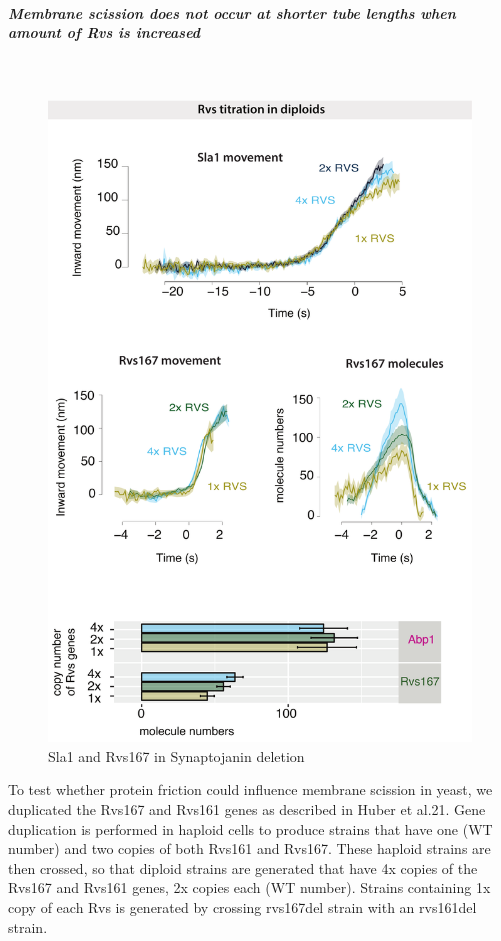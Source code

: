 	\subparagraph{Membrane scission does not occur at shorter tube lengths when amount of Rvs is increased}
		\mbox{}\\
		\begin{figure}
		\centering
		\includegraphics[width=17cm,height=17cm,keepaspectratio]{figures/results_final/protein_friction2}
		\caption{Sla1 and Rvs167 in Synaptojanin deletion \label{fig5}}
		\end{figure}
	To test whether protein friction could influence membrane scission in yeast, we duplicated the Rvs167 and Rvs161 genes as described in Huber et al.21. Gene duplication is performed in haploid cells to produce strains that have one (WT number) and two copies of both Rvs161 and Rvs167. These haploid strains are then crossed, so that diploid strains are generated that have 4x copies of the Rvs167 and Rvs161 genes, 2x copies each (WT number). Strains containing 1x copy of each Rvs is generated by crossing rvs167del strain with an rvs161del strain.
	


